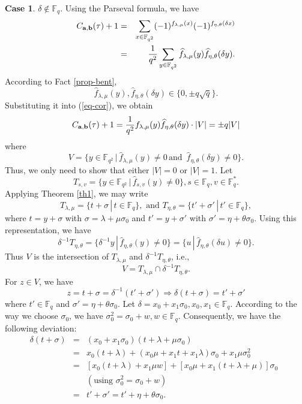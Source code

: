 \documentclass{article}
\newcommand{\F}{\ensuremath{\mathbb F}}
\newcommand{\abu}{{\bf{a}}}
\newcommand{\bbu}{{\bf{b}}}
\begin{document}
{\bf Case 1}.   $\delta \notin \F_q$.   Using the
Parseval formula,  we have 
\begin{eqnarray}
C_{\abu, \bbu}(\tau)+1&=& \sum_{x\in \F_{q^2}}
(-1)^{f_{\lambda,
\mu}(x)}(-1)^{f_{\eta, \theta}(\delta x)} \nonumber \\
&=&\frac{1}{q^2}\sum_{y\in \F_{q^2}}
\widehat{f}_{\lambda, \mu}(y)\widehat{f}_{\eta, \theta}(\delta
y).  \label{eq-cor}
\end{eqnarray}
According to Fact \ref{prop-bent},   
\[
\widehat{f}_{\lambda, \mu}(y), \widehat{f}_{\eta, \theta}(\delta y)\in \{0, \pm q \sqrt{q} \}.
\]
 Substituting it  into (\ref{eq-cor}),  we obtain
\begin{equation}\label{eq-cc}
C_{\abu, \bbu}(\tau)+1=  \frac{1}{q^2}f_ {\lambda, \mu}(y) \widehat{f}_{\eta, \theta}(\delta y)\cdot |V|=\pm q |V|
\end{equation}
where
\[
V=\{y \in \F_{q^2}\,|\,\widehat{f}_{\lambda, \mu}(y)\ne 0\, \mbox{
and }\, \widehat{f}_{\eta, \theta}(\delta y) \neq 0\}.
\]
 Thus,
we only need to show that either $|V|=0$ or $|V|=1$.  
Let 
\begin{equation}\label{eq-T}
T_{s, v}=\{y \in \F_{q^2}\,|\,\widehat{f}_{s,
v}(y)\ne 0\}, s\in \F_q, v\in \F_q^*.\end{equation}  Applying Theorem \ref{th1},  we may write 
\[
T_{\lambda, \mu} = \{t+\sigma \,|\,t\in \F_q\},  \mbox{ and } T_{\eta, \theta} = \{t'+\sigma' \,|\,t'\in \F_q\}, 
\]
where $t=y+\sigma$ with  $\sigma=\lambda +
\mu\sigma_0$ and $t'=y+\sigma'$ with $\sigma'=\eta +
\theta\sigma_0$.   Using this representation, we have
\[
\delta^{-1}T_{\eta, \theta}=\{\delta^{-1}y\,|\,
\widehat{f}_{\eta, \theta}(y) \ne 0\}=  \{u\,|\, \widehat{f}_{\eta, \theta}(\delta u) \ne 0\}.
\]
Thus $V$ is the intersection of   $T_{\lambda, \mu}$ and
$\delta^{-1}T_{\eta, \theta}$, i.e.,
\[
V=T_{\lambda, \mu}\cap \delta^{-1}T_{\eta, \theta}.
\]
For $z\in V$, we have
\[
z=t+\sigma=\delta^{-1}(t'+\sigma') \Longrightarrow
\delta(t+\sigma)=t'+\sigma'\] where $t' \in \F_q$ and
$\sigma'=\eta+\theta \sigma_0$. Let $\delta =x_0+x_1\sigma_0, x_0,
x_1\in \F_q$. According to the way we choose $\sigma_0$,  we have
$\sigma_0^2=\sigma_0+w, w\in \F_q$. Consequently, we have the
following deviation:
\begin{eqnarray*}
\delta(t+\sigma)&=&(x_0+x_1\sigma_0)(t+\lambda+\mu\sigma_0)\\
&=&x_0(t+\lambda)+(x_0\mu+x_1t+x_1\lambda)\sigma_0+x_1\mu\sigma_0^2\\
&=&[x_0(t+\lambda)+x_1\mu
w]+[x_0\mu+x_1(t+\lambda+\mu)]\sigma_0\,\,\, \\
&& (\mbox{using}\,\,
\sigma_0^2=\sigma_0+w)\\
 &=&t'+\sigma'=t'+\eta+\theta\sigma_0.
\end{eqnarray*}
\end{document}
